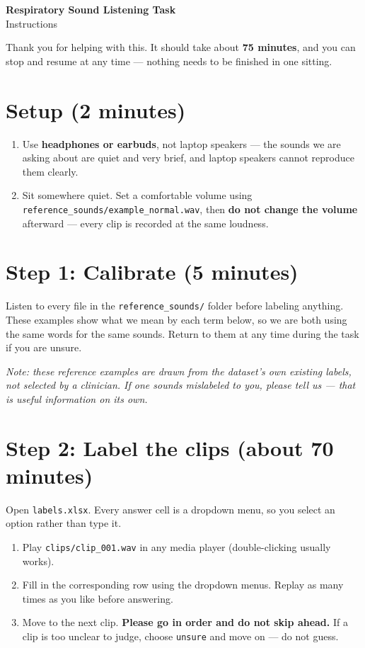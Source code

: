 \documentclass[11pt]{article}
\begin{document}
\begin{center}
{\Large\bfseries Respiratory Sound Listening Task}\\[2pt]
{\normalsize Instructions}
\end{center}

\vspace{2pt}
\noindent Thank you for helping with this. It should take about \textbf{75 minutes}, and you can
stop and resume at any time --- nothing needs to be finished in one sitting.

\section*{Setup (2 minutes)}
\begin{enumerate}
  \item Use \textbf{headphones or earbuds}, not laptop speakers --- the sounds we are asking about
        are quiet and very brief, and laptop speakers cannot reproduce them clearly.
  \item Sit somewhere quiet. Set a comfortable volume using
        \texttt{reference\_sounds/example\_normal.wav}, then \textbf{do not change the volume}
        afterward --- every clip is recorded at the same loudness.
\end{enumerate}

\section*{Step 1: Calibrate (5 minutes)}
Listen to every file in the \texttt{reference\_sounds/} folder before labeling anything. These
examples show what we mean by each term below, so we are both using the same words for the same
sounds. Return to them at any time during the task if you are unsure.

\emph{Note: these reference examples are drawn from the dataset's own existing labels, not
selected by a clinician. If one sounds mislabeled to you, please tell us --- that is useful
information on its own.}

\section*{Step 2: Label the clips (about 70 minutes)}

Open \texttt{labels.xlsx}. Every answer cell is a dropdown menu, so you select an option rather
than type it.

\begin{enumerate}
  \item Play \texttt{clips/clip\_001.wav} in any media player (double-clicking usually works).
  \item Fill in the corresponding row using the dropdown menus. Replay as many times as you like
        before answering.
  \item Move to the next clip. \textbf{Please go in order and do not skip ahead.} If a clip is too
        unclear to judge, choose \texttt{unsure} and move on --- do not guess.
\end{enumerate}
\end{document}
